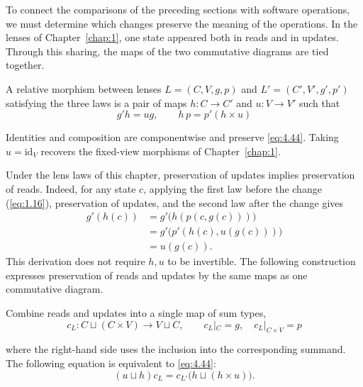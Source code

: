To connect the comparisons of the preceding sections with software operations, we must
determine which changes preserve the meaning of the operations.
In the lenses of Chapter~\ref{chap:1}, one state appeared both in reads and in updates.
Through this sharing, the maps of the two commutative diagrams are tied together.

\begin{definition}\label{def:4.36}

A relative morphism between lenses $L=(C,V,g,p)$ and $L'=(C',V',g',p')$
satisfying the three laws is a pair of maps $h:C\to C'$ and $u:V\to V'$ such that
\begin{equation*}
g'h=ug,\qquad
h\,p=p'(h\times u)
\tag{4.44}\label{eq:4.44}
\end{equation*}

Identities and composition are componentwise and preserve \eqref{eq:4.44}.
Taking $u=\mathrm{id}_V$ recovers the fixed-view morphisms of Chapter~\ref{chap:1}.

\end{definition}

Under the lens laws of this chapter, preservation of updates implies preservation of reads.
Indeed, for any state $c$, applying the first law before the change
(\eqref{eq:1.16}), preservation of updates, and the second law after the change gives
\[
\begin{aligned}
g'(h(c))
&=g'\bigl(h(p(c,g(c)))\bigr)\\
&=g'\bigl(p'(h(c),u(g(c)))\bigr)\\
&=u(g(c)).
\end{aligned}
\]
This derivation does not require $h,u$ to be invertible.
The following construction expresses preservation of reads and updates by the same
maps as one commutative diagram.

\begin{proposition}\label{prop:4.37}

Combine reads and updates into a single map of sum types,
\begin{equation*}
c_L:C\sqcup(C\times V)\longrightarrow V\sqcup C,\qquad
c_L|_C=g,\quad c_L|_{C\times V}=p
\tag{4.45}\label{eq:4.45}
\end{equation*}

where the right-hand side uses the inclusion into the corresponding summand.
The following equation is equivalent to \eqref{eq:4.44}:
\begin{equation*}
(u\sqcup h)c_L
=c_{L'}\bigl(h\sqcup(h\times u)\bigr).
\tag{4.46}\label{eq:4.46}
\end{equation*}

\end{proposition}

